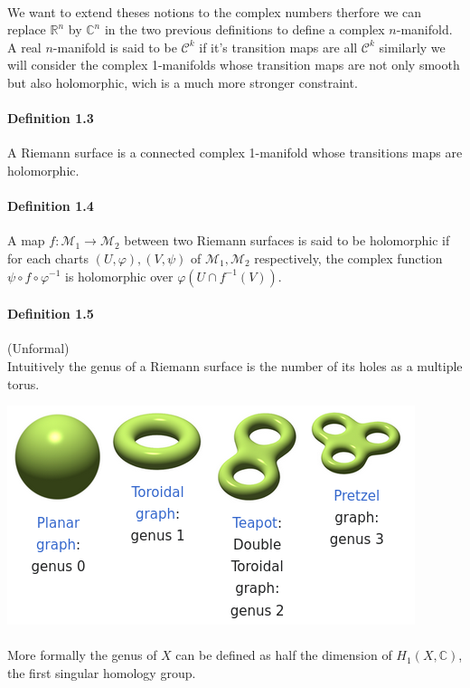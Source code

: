 \documentclass[letterpaper,10pt]{article}
\begin{document}
{\itshape \paragraph{} We want to extend theses notions to the complex numbers therfore we can replace $\mathbb{R}^n$ by $\mathbb{C}^n$ in the
 two previous definitions to define a complex $n$-manifold. A real $n$-manifold is said to be $\mathcal{C}^k$ if it's transition maps are all $\mathcal{C}^k$ 
 similarly we will consider the complex 1-manifolds whose transition maps are not only smooth but also holomorphic, wich is a much more stronger constraint.}

\paragraph{Definition 1.3} A Riemann surface is a connected complex 1-manifold whose transitions maps are holomorphic.

\paragraph{Definition 1.4} A map $f : \mathcal{M}_1 \to \mathcal{M}_2$ between two Riemann surfaces is said to be holomorphic if for each charts $(U,\varphi),(V,\psi)$
of $\mathcal{M}_1,\mathcal{M}_2$ respectively, the complex function $\psi \circ f \circ \varphi^{-1}$ is holomorphic over $\varphi(U\cap f^{-1}(V))$.

\paragraph{Definition 1.5} (Unformal) \\ Intuitively the genus of a Riemann surface is the number of its holes as a multiple torus. 

\includegraphics[scale=0.7]{genus}

{\itshape \paragraph{} More formally the genus of $X$ can be defined as half the dimension of $H_1(X,\mathbb{C})$, the first singular homology group.  } 
\end{document}
